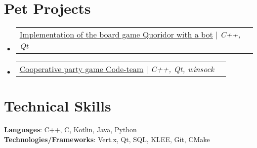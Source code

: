 \documentclass[letterpaper,11pt]{article}
\makeatletter
\newcommand{\resumeItem}[1]{
  \item\large{
    {#1 \vspace{-2pt}}
  }
}
\newcommand{\resumeProjectHeading}[2]{
    \item
    \begin{tabular*}{1.001\textwidth}{l@{\extracolsep{\fill}}r}
      #1 & \textbf{ #2}\\
    \end{tabular*}\vspace{-7pt}
}
\newcommand{\resumeSubHeadingListStart}{\begin{itemize}[leftmargin=0.0in, label={}]}
\newcommand{\resumeSubHeadingListEnd}{\end{itemize}}
\newcommand{\resumeItemListStart}{\begin{itemize}}
\newcommand{\resumeItemListEnd}{\end{itemize}\vspace{-5pt}}
\makeatother
\begin{document}
\section{Pet Projects}
    \vspace{-5pt}
    \resumeSubHeadingListStart
      \resumeProjectHeading
      {{\href{https://github.com/olezhabobrov/Quoridor}{\underline{Implementation of the board game Quoridor with a bot}}} $|$ \emph{C++, Qt}}{}
      \begin{comment}
      \resumeItemListStart
        \resumeItem{Developed the GUI board game Quoridor for 2 players}
        \resumeItem{Players can play against each other or against bot working with \textbf{MiniMax algorithm}}
        \resumeItem{Achieved the \textbf{search depth of 4} using \textbf{alpha-beta pruning} with time of calculations less than \textbf{1 second} on my computer}        
      \resumeItemListEnd 
    \end{comment}
      \vspace{-20pt}

      \resumeProjectHeading
          {{\href{https://github.com/Code-team-open-source/Code-team}{\underline{Cooperative party game Code-team}}} $|$ \emph{C++, Qt, winsock} }{}
          \begin{comment}
          \resumeItemListStart
            \resumeItem{Code-team is a local cooperative multiplayer game challenging peoples' reaction and communication}
            \resumeItem{Developed Code-team in the team of 3 students as a part of a first-year course project}
            \resumeItem{Designed and implemented the game architecture and logic between the server and players using thread safe queues}
          \resumeItemListEnd
          \end{comment}
         \vspace{-13pt}

    \resumeSubHeadingListEnd
\vspace{-5pt}


%
\section{Technical Skills}
 \begin{itemize}[leftmargin=0.15in, label={}]
    \large{\item{
     \textbf{Languages}{:  C++, C, Kotlin, Java, Python} \\
     \textbf{Technologies/Frameworks}{: Vert.x, Qt, SQL, KLEE, Git, CMake} \\
    }}
 \end{itemize}
 \vspace{-16pt}
\end{document}
